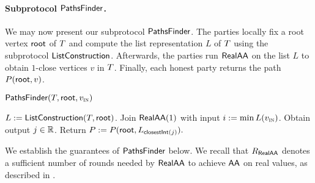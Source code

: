 \paragraph{Subprotocol $\textsf{PathsFinder}$. } We may now present our subprotocol $\textsf{PathsFinder}$. The parties locally fix a root vertex $\textsf{root}$ of $T$ and compute the list representation $L$ of $T$ using the subprotocol $\textsf{ListConstruction}$. Afterwards, the parties run $\textsf{RealAA}$ on the list $L$ to obtain $1$-close vertices $v$ in $T$. Finally, each honest party returns the path $P(\textsf{root}, v)$.
\begin{dianabox}{$\textsf{PathsFinder}(T, \textsf{root}, v_{\textsc{in}})$}
	\begin{algorithmic}[1]
            \State $L := \textsf{ListConstruction}(T, \textsf{root})$.
            \State Join $\textsf{RealAA}(1)$ with input $i := \min L(v_{\textsc{in}})$. Obtain output $j \in \mathbb{R}$.
            Return $P := P(\textsf{root}, L_{\textsf{closestInt}(j)}).$ 
    \end{algorithmic}
\end{dianabox}

We establish the guarantees of $\textsf{PathsFinder}$ below. We recall that $R_{\textsf{RealAA}}$ denotes a sufficient number of rounds needed by $\textsf{RealAA}$ to achieve $\textsf{AA}$ on real values, as described in .

